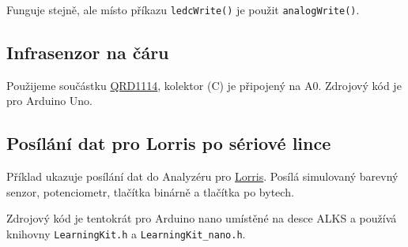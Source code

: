
 
Funguje stejně, ale místo příkazu {\tt ledcWrite()} je použit {\tt analogWrite()}.

\subsection{Infrasenzor na čáru} \label{prog:qrd1114}

Použijeme součástku \hyperref[qrd1114]{QRD1114}, kolektor (C) je připojený na A0. Zdrojový kód je pro Arduino Uno. 



\subsection{Posílání dat pro Lorris po sériové lince} \label{prog:lorris}

Příklad ukazuje posílání dat do Analyzéru pro \hyperref[lorris]{Lorris}.
 Posílá simulovaný barevný senzor, potenciometr, tlačítka binárně a tlačítka po bytech. 

Zdrojový kód je tentokrát pro Arduino nano umístěné na desce ALKS a používá knihovny
{\tt LearningKit.h}  a  {\tt LearningKit\_nano.h}. 




